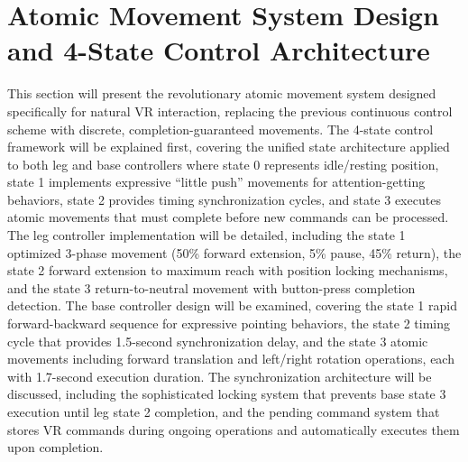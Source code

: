 \section{Atomic Movement System Design and 4-State Control Architecture}
This section will present the revolutionary atomic movement system designed specifically for natural VR interaction, replacing the previous continuous control scheme with discrete, completion-guaranteed movements. The 4-state control framework will be explained first, covering the unified state architecture applied to both leg and base controllers where state 0 represents idle/resting position, state 1 implements expressive ``little push'' movements for attention-getting behaviors, state 2 provides timing synchronization cycles, and state 3 executes atomic movements that must complete before new commands can be processed. The leg controller implementation will be detailed, including the state 1 optimized 3-phase movement (50\% forward extension, 5\% pause, 45\% return), the state 2 forward extension to maximum reach with position locking mechanisms, and the state 3 return-to-neutral movement with button-press completion detection. The base controller design will be examined, covering the state 1 rapid forward-backward sequence for expressive pointing behaviors, the state 2 timing cycle that provides 1.5-second synchronization delay, and the state 3 atomic movements including forward translation and left/right rotation operations, each with 1.7-second execution duration. The synchronization architecture will be discussed, including the sophisticated locking system that prevents base state 3 execution until leg state 2 completion, and the pending command system that stores VR commands during ongoing operations and automatically executes them upon completion.

